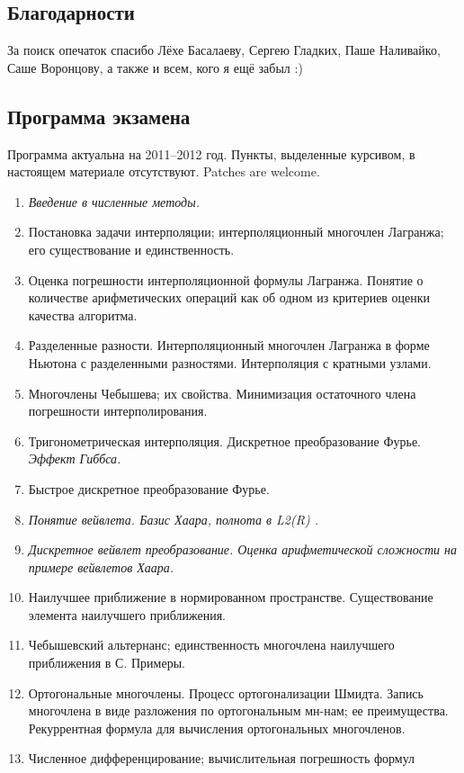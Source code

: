\documentclass[a4paper]{article}
\begin{document}
\subsection*{Благодарности}

За поиск опечаток спасибо Лёхе Басалаеву, Сергею Гладких, Паше
Наливайко, Саше Воронцову, а также и всем, кого я ещё забыл :)
\subsection*{Программа экзамена}
Программа актуальна на 2011--2012 год. Пункты, выделенные курсивом,
в настоящем материале отсутствуют. Patches are welcome.
\begin{enumerate}
\item {\it Введение в численные методы.}
\item Постановка задачи интерполяции; интерполяционный многочлен
  Лагранжа; его существование и единственность.
\item Оценка погрешности интерполяционной формулы Лагранжа. Понятие
  о количестве арифметических операций как об одном из критериев
  оценки качества алгоритма.
\item Разделенные разности. Интерполяционный многочлен Лагранжа в
  форме Ньютона с разделенными разностями. Интерполяция с кратными
  узлами.
\item Многочлены Чебышева; их свойства. Минимизация остаточного члена
  погрешности интерполирования.
\item Тригонометрическая интерполяция. Дискретное преобразование
  Фурье.  {\it Эффект Гиббса.}
\item Быстрое дискретное преобразование Фурье.
\item {\it Понятие вейвлета. Базис Хаара, полнота в L2(R) .}
\item {\it Дискретное вейвлет преобразование. Оценка арифметической
  сложности на примере вейвлетов Хаара.}
\item Наилучшее приближение в нормированном
  пространстве. Существование элемента наилучшего приближения.
\item Чебышевский альтернанс; единственность многочлена наилучшего
  приближения в С. Примеры.
\item Ортогональные многочлены. Процесс ортогонализации
  Шмидта. Запись многочлена в виде разложения по ортогональным
  мн-нам; ее преимущества. Рекуррентная формула для вычисления
  ортогональных многочленов.
\item Численное дифференцирование; вычислительная погрешность формул

\end{enumerate}
\end{document}
